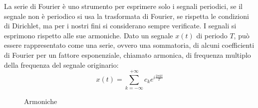 \documentclass{article}
\numberwithin{equation}{subsection}
\begin{document}
La serie di Fourier è uno strumento per esprimere solo i segnali periodici, 
se il segnale non è periodico si usa la trasformata di Fourier, se rispetta le condizioni di Dirichlet, ma per i nostri fini si considerano sempre verificate. 
I segnali si esprimono rispetto alle sue armoniche. Dato un segnale $x(t)$ di periodo $T$, può essere rappresentato come una serie, ovvero una sommatoria, di alcuni 
coefficienti di Fourier per un fattore esponenziale, chiamato armonica, di frequenza multiplo della frequenza del segnale originario:
\begin{equation}
    x(t)=\displaystyle\sum_{k=-\infty}^{+\infty}c_ke^{i\frac{2\pi  k t}{T}}
\end{equation}
\begin{figure}[H]%
    \centering
    \qquad
    \qquad
    \caption{Armoniche}
\end{figure}
\end{document}
